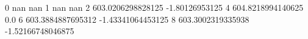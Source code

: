 0 nan nan
1 nan nan
2 603.0206298828125 -1.80126953125
4 604.8218994140625 0.0
6 603.3884887695312 -1.43341064453125
8 603.3002319335938 -1.52166748046875
